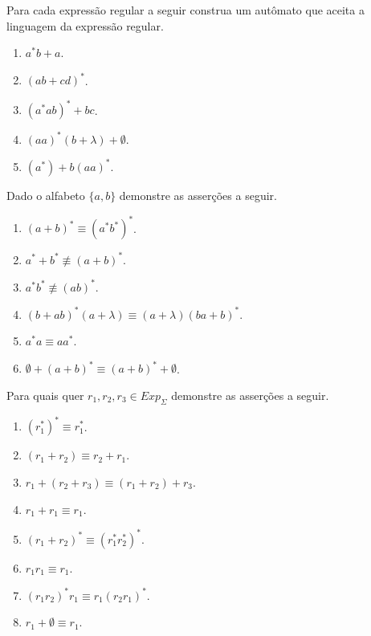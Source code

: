 \begin{problemset}
	\item Para cada expressão regular a seguir construa um autômato que aceita a linguagem da expressão regular.
	\begin{enumerate}
		\item $a^*b + a$.
		\item $(ab + cd)^*$.
		\item $(a^*ab)^* + bc$.
		\item $(aa)^* (b + \lambda) + \emptyset$.
		\item $(a^*) + b(aa)^*$.
	\end{enumerate}
	
	\item Dado o alfabeto $\{a, b\}$ demonstre as asserções a seguir.
	\begin{enumerate}
		\item $(a + b)^* \equiv (a^*b^*)^*$.
		\item $a^* + b^* \not\equiv (a + b)^*$.
		\item $a^*b^* \not\equiv (ab)^*$.
		\item $(b + ab)^* (a + \lambda) \equiv (a + \lambda)(ba + b)^*$.
		\item $a^*a \equiv aa^*$.
		\item $\emptyset + (a + b)^* \equiv (a + b)^* + \emptyset$.
	\end{enumerate}

	\item Para quais quer $r_1, r_2, r_3 \in Exp_\Sigma$ demonstre as asserções a seguir.
	\begin{enumerate}
		\item $(r_1^*)^* \equiv r_1^*$.
		\item $(r_1 + r_2) \equiv r_2 + r_1$.
		\item $r_1 + (r_2 + r_3) \equiv (r_1 + r_2) + r_3$.
		\item $r_1 + r_1 \equiv r_1$.
		\item $(r_1 + r_2)^* \equiv (r_1^* r_2^*)^*$.
		\item $r_1r_1 \equiv r_1$.
		\item $(r_1r_2)^*r_1 \equiv r_1(r_2r_1)^*$.
		\item $r_1 + \emptyset \equiv r_1$.
	\end{enumerate}


\end{problemset}

